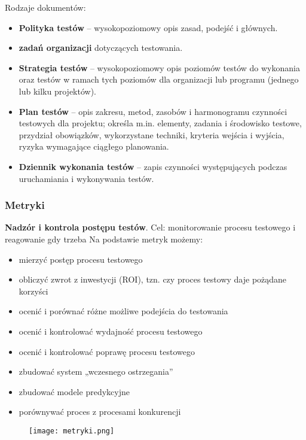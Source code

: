 \documentclass[../main.tex]{subfiles}
\begin{document}
    Rodzaje dokumentów:
    \begin{itemize}
        \item \textbf{Polityka testów} – wysokopoziomowy opis zasad, podejść i głównych.
        \item \textbf{zadań organizacji} dotyczących testowania.
        \item \textbf{Strategia testów} – wysokopoziomowy opis poziomów testów do wykonania oraz testów w ramach tych poziomów dla organizacji lub programu (jednego lub kilku projektów).
        \item \textbf{Plan testów} – opis zakresu, metod, zasobów i harmonogramu czynności testowych dla projektu; określa m.in. elementy, zadania i środowisko testowe, przydział obowiązków, wykorzystane techniki, kryteria wejścia i wyjścia, ryzyka wymagające ciągłego planowania.
        \item \textbf{Dziennik wykonania testów} – zapis czynności występujących podczas uruchamiania i wykonywania testów.
    \end{itemize}

    \subsubsection{Metryki}

    \textbf{Nadzór i kontrola postępu testów}. Cel: monitorowanie procesu testowego i reagowanie gdy trzeba
    Na podstawie metryk możemy:

    \begin{itemize}
        \item mierzyć postęp procesu testowego
        \item obliczyć zwrot z inwestycji (ROI), tzn. czy proces testowy daje pożądane korzyści
        \item ocenić i porównać różne możliwe podejścia do testowania
        \item ocenić i kontrolować wydajność procesu testowego
        \item ocenić i kontrolować poprawę procesu testowego
        \item zbudować system „wczesnego ostrzegania”
        \item zbudować modele predykcyjne
        \item porównywać proces z procesami konkurencji
    \end{itemize}


    \begin{figure}[H]
        \texttt{[image: metryki.png]}
    \end{figure}
\end{document}
